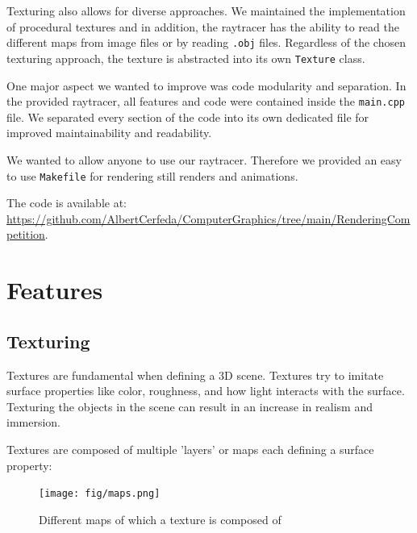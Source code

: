 \documentclass[tikz,14pt,fleqn]{article}
\begin{document}
Texturing also allows for diverse approaches. We maintained the implementation of procedural textures and in addition, the raytracer has the ability to read the different maps from image files or by reading \verb|.obj| files. Regardless of the chosen texturing approach, the texture is abstracted into its own \verb|Texture| class.

One major aspect we wanted to improve was code modularity and separation. In the provided raytracer, all features and code were contained inside the \verb|main.cpp| file. We separated every section of the code into its own dedicated file for improved maintainability and readability.

We wanted to allow anyone to use our raytracer. Therefore we provided an easy to use \verb|Makefile| for rendering still renders and animations.

The code is available at:\\
\url{https://github.com/AlbertCerfeda/ComputerGraphics/tree/main/RenderingCompetition}.




\section{Features}

\subsection{Texturing}
Textures are fundamental when defining a 3D scene. Textures try to imitate surface properties like color, roughness, and how light interacts with the surface. Texturing the objects in the scene can result in an increase in realism and immersion.

Textures are composed of multiple 'layers' or maps each defining a surface property:
\begin{figure}[h!]
\centering
\texttt{[image: fig/maps.png]}
\caption{Different maps of which a texture is composed of}
\end{figure}
\end{document}
